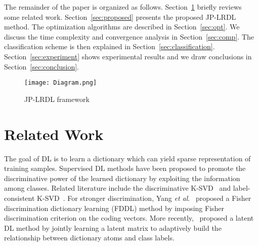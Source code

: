\documentclass[journal]{IEEEtran}
\newcommand{\etal}{\textit{et al}.}
\begin{document}
The remainder of the paper is organized as follows. Section~\ref{sec:rel} briefly reviews some related work. Section~\ref{sec:proposed} presents the proposed JP-LRDL method. The optimization algorithms are described in Section~\ref{sec:opt}. We discuss the time complexity and convergence analysis in Section~\ref{sec:comp}. The classification scheme is then explained in Section~\ref{sec:classification}. Section~\ref{sec:experiment} shows experimental results and we draw conclusions in Section~\ref{sec:conclusion}.
\begin{figure}[t]
\centering
\texttt{[image: Diagram.png]}
\caption{JP-LRDL framework}
\label{fig:Diagram}
\vspace{-1.5em}
\end{figure}
\section{Related Work}
\label{sec:rel}
The goal of DL is to learn a dictionary which can yield sparse representation of training samples. Supervised DL methods have been proposed to promote the discriminative power of the learned dictionary by exploiting the information among classes. Related literature include the discriminative K-SVD~\cite{DKSVD} and label-consistent K-SVD~\cite{LC-KSVD}. For stronger discrimination, Yang \etal~\cite{FDDL} proposed a Fisher discrimination dictionary learning (FDDL) method by imposing Fisher discrimination criterion on the coding vectors. More recently,~\cite{Latent-DL} proposed a latent DL method by jointly learning a latent matrix to adaptively build the relationship between dictionary atoms and class labels.
\end{document}
